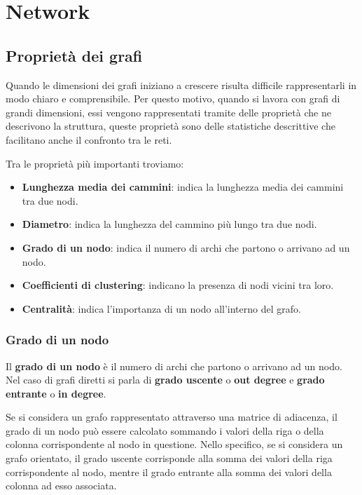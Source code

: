 \chapter{Network}
\section{Proprietà dei grafi}
Quando le dimensioni dei grafi iniziano a crescere risulta difficile
rappresentarli in modo chiaro e comprensibile. Per questo motivo, quando si
lavora con grafi di grandi dimensioni, essi vengono rappresentati tramite
delle proprietà che ne descrivono la struttura, queste proprietà sono delle
statistiche descrittive che facilitano anche il confronto tra le reti.

Tra le proprietà più importanti troviamo:
\begin{itemize}
    \item \textbf{Lunghezza media dei cammini}: indica la lunghezza media dei
          cammini tra due nodi.
    \item \textbf{Diametro}: indica la lunghezza del cammino più lungo tra due
          nodi.
    \item \textbf{Grado di un nodo}: indica il numero di archi che partono o
          arrivano ad un nodo.
    \item \textbf{Coefficienti di clustering}: indicano la presenza di nodi
          vicini tra loro.
    \item \textbf{Centralità}: indica l'importanza di un nodo all'interno del
          grafo.
\end{itemize}
\subsection{Grado di un nodo}
\begin{definizione}
    Il \textbf{grado di un nodo} è il numero di archi che partono o arrivano ad
    un nodo. Nel caso di grafi diretti si parla di \textbf{grado uscente} o
    \textbf{out degree} e \textbf{grado entrante} o \textbf{in degree}.
\end{definizione}
Se si considera un grafo rappresentato attraverso una matrice di adiacenza, il
grado di un nodo può essere calcolato sommando i valori della riga o della
colonna corrispondente al nodo in questione. Nello specifico, se si considera
un grafo orientato, il grado uscente corrisponde alla somma dei valori della
riga corrispondente al nodo, mentre il grado entrante alla somma dei valori della
colonna ad esso associata.

